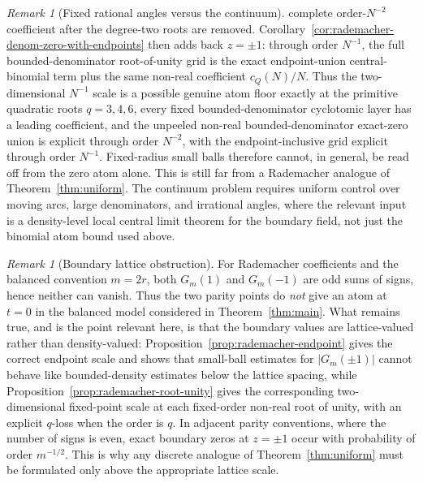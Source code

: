 \documentclass[11pt]{amsart}
\numberwithin{equation}{section}
\theoremstyle{definition}
\theoremstyle{remark}
\newtheorem{remark}[theorem]{Remark}
\newcommand{\abs}[1]{\left\lvert #1\right\rvert}
\begin{document}
\begin{remark}[Fixed rational angles versus the continuum]
complete order-\(N^{-2}\) coefficient after the degree-two roots are removed.
Corollary~\ref{cor:rademacher-denom-zero-with-endpoints} then adds back
\(z=\pm1\): through order \(N^{-1}\), the full bounded-denominator
root-of-unity grid is the exact endpoint-union central-binomial term plus the
same non-real coefficient \(c_Q(N)/N\).
Thus the two-dimensional \(N^{-1}\) scale is a possible genuine atom floor
exactly at the primitive quadratic roots \(q=3,4,6\), every fixed
bounded-denominator cyclotomic layer has a leading coefficient, and the
unpeeled non-real bounded-denominator exact-zero union is explicit through
order \(N^{-2}\), with the endpoint-inclusive grid explicit through
order \(N^{-1}\).
Fixed-radius small balls therefore cannot, in general, be read off from the zero
atom alone.  This is still far from a Rademacher analogue of
Theorem~\ref{thm:uniform}.  The continuum problem requires uniform control over
moving arcs, large denominators, and irrational angles, where the relevant input
is a density-level local central limit theorem for the boundary field, not just
the binomial atom bound used above.
\end{remark}

\begin{remark}[Boundary lattice obstruction]\label{rem:bernoulli-lattice}
For Rademacher coefficients and the balanced convention \(m=2r\), both \(G_m(1)\) and \(G_m(-1)\) are odd sums of signs, hence neither can vanish. Thus the two parity points do \emph{not} give an atom at \(t=0\) in the balanced model considered in Theorem~\ref{thm:main}. What remains true, and is the point relevant here, is that the boundary values are lattice-valued rather than density-valued: Proposition~\ref{prop:rademacher-endpoint} gives the correct endpoint scale and shows that small-ball estimates for \(\abs{G_m(\pm1)}\) cannot behave like bounded-density estimates below the lattice spacing, while Proposition~\ref{prop:rademacher-root-unity} gives the corresponding two-dimensional fixed-point scale at each fixed-order non-real root of unity, with an explicit \(q\)-loss when the order is \(q\). In adjacent parity conventions, where the number of signs is even, exact boundary zeros at \(z=\pm1\) occur with probability of order \(m^{-1/2}\). This is why any discrete analogue of Theorem~\ref{thm:uniform} must be formulated only above the appropriate lattice scale.
\end{remark}
\end{document}
